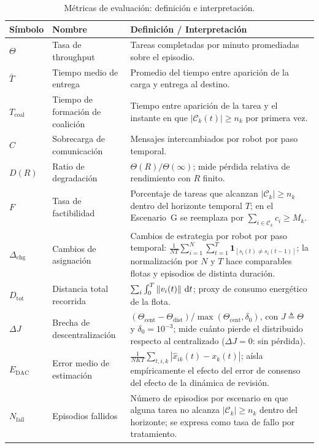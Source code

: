 \begin{table}[htbp]
\centering
\small
\caption[Métricas de evaluación]{Métricas de evaluación: definición e interpretación.}
\label{tab:metricas}
\begin{tabularx}{\textwidth}{@{}>{\bfseries}p{}p{}Y@{}}
\toprule
Símbolo & Nombre & Definición / Interpretación \\
\midrule
$\Theta$ & Tasa de throughput &
  Tareas completadas por minuto promediadas sobre el episodio. \\
$\bar{T}$ & Tiempo medio de entrega &
  Promedio del tiempo entre aparición de la carga y entrega al destino. \\
$T_{\text{coal}}$ & Tiempo de formación de coalición &
  Tiempo entre aparición de la tarea y el instante en que
  $|\mathcal{C}_k(t)| \geq n_k$ por primera vez. \\
$C$ & Sobrecarga de comunicación &
  Mensajes intercambiados por robot por paso temporal. \\
$D(R)$ & Ratio de degradación &
  $\Theta(R)/\Theta(\infty)$; mide pérdida relativa de rendimiento con $R$ finito. \\
$F$ & Tasa de factibilidad &
  Porcentaje de tareas que alcanzan $|\mathcal{C}_k| \geq n_k$ dentro del
  horizonte temporal $T$; en el Escenario~G se reemplaza por
  $\sum_{i\in\mathcal{C}_k}c_i\geq M_k$. \\
$\Delta_{\text{chg}}$ & Cambios de asignación &
  Cambios de estrategia por robot por paso temporal:
  $\frac{1}{NT}\sum_{i=1}^{N}\sum_{t=1}^{T}\mathbf{1}_{[s_i(t)\neq s_i(t-1)]}$;
  la normalización por $N$ y $T$ hace comparables flotas y episodios de distinta
  duración. \\
$D_{\text{tot}}$ & Distancia total recorrida &
  $\sum_i \int_0^T \left\|v_i(t)\right\|\,\mathrm{d}t$; proxy de consumo energético
  de la flota. \\
$\Delta J$ & Brecha de descentralización &
  $(\Theta_{\text{cent}} - \Theta_{\text{dist}}) / \max(\Theta_{\text{cent}}, \delta_0)$,
  con $J \triangleq \Theta$ y $\delta_0 = 10^{-3}$;
  mide cuánto pierde el distribuido respecto al centralizado ($\Delta J = 0$: sin pérdida). \\
$E_{\text{DAC}}$ & Error medio de estimación &
  $\frac{1}{NKT}\sum_{t,i,k}|\hat{x}_{ik}(t) - x_k(t)|$;
  aísla empíricamente el efecto del error de consenso del efecto de la dinámica de
  revisión. \\
$N_{\text{fail}}$ & Episodios fallidos &
  Número de episodios por escenario en que alguna tarea no alcanza
  $|\mathcal{C}_k| \geq n_k$ dentro del horizonte; se expresa como tasa de fallo
  por tratamiento. \\
\bottomrule
\end{tabularx}
\end{table}

